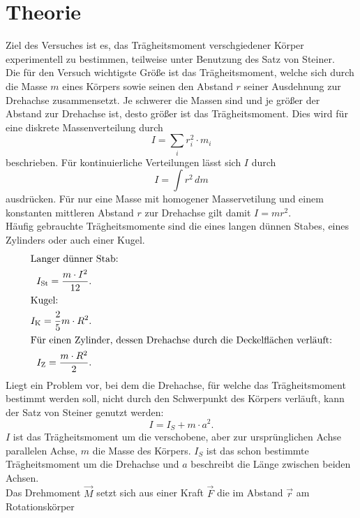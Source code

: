 \section{Theorie}
\label{sec:Theorie}
Ziel des Versuches ist es, das Trägheitsmoment verschgiedener Körper
experimentell zu bestimmen, teilweise unter Benutzung des Satz von Steiner.
\\ \noindent
Die für den Versuch wichtigste Größe ist das Trägheitsmoment, welche sich durch die Masse $m$
eines Körpers sowie seinen den Abstand $r$ seiner Ausdehnung zur Drehachse zusammensetzt. Je schwerer die Massen sind und je größer der Abstand 
zur Drehachse ist, desto größer ist das Trägheitsmoment. Dies wird für eine diskrete Massenverteilung durch  
\begin{equation}
    I=\sum_i r_i^2\cdot m_i
\end{equation}
beschrieben.
Für kontinuierliche Verteilungen lässt sich $I$ durch 
\begin{equation}
    I=\int r^2\, dm
\end{equation}
ausdrücken. Für nur eine Masse mit homogener Masservetilung und einem konstanten mittleren Abstand $r$ zur Drehachse gilt damit 
$I=mr^2$. \\ \noindent
Häufig gebrauchte Trägheitsmomente sind die eines langen dünnen Stabes, eines 
Zylinders oder auch einer Kugel.
\begin{align}
    \intertext{Langer dünner Stab:}
    I_{\text{St}}=\frac{m\cdot I^2}{12}.\\
    \label{eq:Stab}
    \intertext{Kugel:}
    I_\text{K}=\frac{2}{5}m\cdot R^2.\\
    \label{eq:Kugel}
    \intertext{Für einen Zylinder, dessen Drehachse durch die Deckelflächen verläuft:}
    I_\text{Z}=\frac{m\cdot R^2}{2}.
    \label{eq:Zylinder}
\end{align}
Liegt ein Problem vor, bei dem die Drehachse, für welche das Trägheitsmoment bestimmt werden soll,
nicht durch den Schwerpunkt des Körpers verläuft, kann der Satz von Steiner genutzt werden: 
\begin{equation}
    I=I_S+m\cdot a^2.
\end{equation}
$I$ ist das Trägheitsmoment um die verschobene, aber zur ursprünglichen Achse parallelen Achse,
$m$ die Masse des Körpers. $I_S$ ist das schon bestimmte Trägheitsmoment um die Drehachse und $a$
beschreibt die Länge zwischen beiden Achsen.\\ \noindent
Das Drehmoment $\vec M$ setzt sich aus einer Kraft $\vec F$ die im Abstand $\vec r$ am Rotationskörper 
